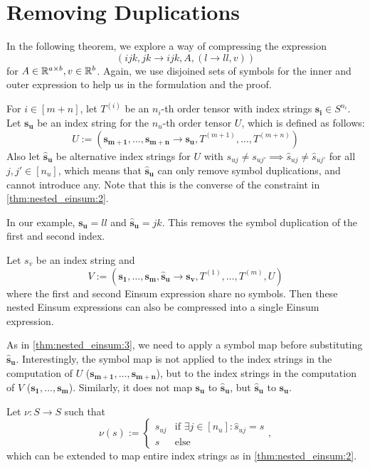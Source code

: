 \section{Removing Duplications}

In the following theorem, we explore a way of compressing the expression
$$(ijk, jk \rightarrow ijk, A, (l \rightarrow ll, v))$$
for $A \in \mathbb{R}^{a \times b}, v \in \mathbb{R}^b$.
Again, we use disjoined sets of symbols for the inner and outer expression to help us in the formulation and the proof.

\begin{theorem}
    \label{thm:nested_einsum:3}

    For $i \in [m + n]$, let $T^{(i)}$ be an $n_i$-th order tensor with index strings $\bm{s_i} \in S^{n_i}$.
    Let $\bm{s_u}$ be an index string for the $n_u$-th order tensor $U$, which is defined as follows:
    $$U := (\bm{s_{m + 1}},\dots,\bm{s_{m + n}} \rightarrow \bm{s_u}, T^{(m + 1)},\dots,T^{(m + n)})$$
    Also let $\bm{\hat{s}_u}$ be alternative index strings for $U$ with $s_{uj} \neq s_{uj'} \implies \hat{s}_{uj} \neq \hat{s}_{uj'}$ for all $j, j' \in [n_u]$,
    which means that $\bm{\hat{s}_u}$ can only remove symbol duplications, and cannot introduce any.
    Note that this is the converse of the constraint in \autoref{thm:nested_einsum:2}.

    In our example, $\bm{s_u} = ll$ and $\bm{\hat{s}_u} = jk$.
    This removes the symbol duplication of the first and second index.

    Let $s_v$ be an index string and
    $$V := (\bm{s_1},\dots,\bm{s_m}, \bm{\hat{s}_u} \rightarrow \bm{s_v}, T^{(1)},\dots,T^{(m)}, U)$$
    where the first and second Einsum expression share no symbols.
    Then these nested Einsum expressions can also be compressed into a single Einsum expression.

    As in \autoref{thm:nested_einsum:3}, we need to apply a symbol map before substituting $\bm{\hat{s}_u}$.
    Interestingly, the symbol map is not applied to the index strings in the computation of $U$ ($\bm{s_{m + 1}},\dots,\bm{s_{m + n}}$),
    but to the index strings in the computation of $V$ ($\bm{s_1},\dots,\bm{s_m}$).
    Similarly, it does not map $\bm{s_u}$ to $\bm{\hat{s}_u}$, but $\bm{\hat{s}_u}$ to $\bm{s_u}$.

    Let $\nu: S \rightarrow S$ such that
    $$\nu(s) := \begin{cases}
            s_{uj} & \text{if }\exists j \in [n_u]: \hat{s}_{uj} = s \\
            s      & \text{else}
        \end{cases},$$
    which can be extended to map entire index strings as in \autoref{thm:nested_einsum:2}.


\end{theorem}
